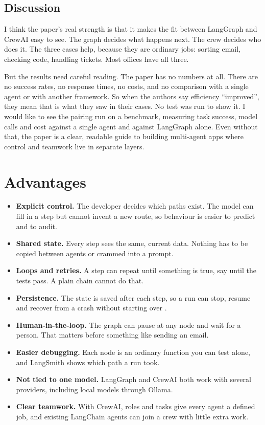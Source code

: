\documentclass[12pt,a4paper]{report}
\begin{document}
\section{Discussion}

I think the paper's real strength is that it makes the fit between LangGraph and CrewAI easy to see. The graph decides what happens next. The crew decides who does it. The three cases help, because they are ordinary jobs: sorting email, checking code, handling tickets. Most offices have all three.

But the results need careful reading. The paper has no numbers at all. There are no success rates, no response times, no costs, and no comparison with a single agent or with another framework. So when the authors say efficiency ``improved'', they mean that is what they saw in their cases. No test was run to show it. I would like to see the pairing run on a benchmark, measuring task success, model calls and cost against a single agent and against LangGraph alone. Even without that, the paper is a clear, readable guide to building multi-agent apps where control and teamwork live in separate layers.

\chapter{Advantages}

\begin{itemize}
    \item \textbf{Explicit control.} The developer decides which paths exist. The model can fill in a step but cannot invent a new route, so behaviour is easier to predict and to audit.
    \item \textbf{Shared state.} Every step sees the same, current data. Nothing has to be copied between agents or crammed into a prompt.
    \item \textbf{Loops and retries.} A step can repeat until something is true, say until the tests pass. A plain chain cannot do that.
    \item \textbf{Persistence.} The state is saved after each step, so a run can stop, resume and recover from a crash without starting over \cite{langgraphdocs}.
    \item \textbf{Human-in-the-loop.} The graph can pause at any node and wait for a person. That matters before something like sending an email.
    \item \textbf{Easier debugging.} Each node is an ordinary function you can test alone, and LangSmith \cite{langsmith} shows which path a run took.
    \item \textbf{Not tied to one model.} LangGraph and CrewAI both work with several providers, including local models through Ollama.
    \item \textbf{Clear teamwork.} With CrewAI, roles and tasks give every agent a defined job, and existing LangChain agents can join a crew with little extra work.
\end{itemize}
\end{document}
